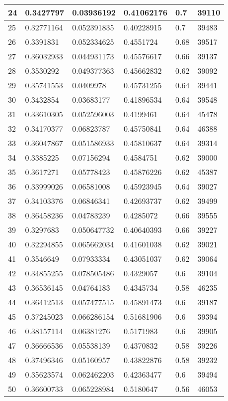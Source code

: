 \begin{longtable}{|l|l|l|l|l|l|}
24 & 0.3427797 & 0.03936192 & 0.41062176 & 0.7 & 39110 \\ \hline 
25 & 0.32771164 & 0.052391835 & 0.40228915 & 0.7 & 39483 \\ \hline 
26 & 0.3391831 & 0.052334625 & 0.4551724 & 0.68 & 39517 \\ \hline 
27 & 0.36032933 & 0.044931173 & 0.45576617 & 0.66 & 39137 \\ \hline 
28 & 0.3530292 & 0.049377363 & 0.45662832 & 0.62 & 39092 \\ \hline 
29 & 0.35741553 & 0.0409978 & 0.45731255 & 0.64 & 39441 \\ \hline 
30 & 0.3432854 & 0.03683177 & 0.41896534 & 0.64 & 39548 \\ \hline 
31 & 0.33610305 & 0.052596003 & 0.4199461 & 0.64 & 45478 \\ \hline 
32 & 0.34170377 & 0.06823787 & 0.45750841 & 0.64 & 46388 \\ \hline 
33 & 0.36047867 & 0.051586933 & 0.45810637 & 0.64 & 39314 \\ \hline 
34 & 0.3385225 & 0.07156294 & 0.4584751 & 0.62 & 39000 \\ \hline 
35 & 0.3617271 & 0.05778423 & 0.45876226 & 0.62 & 45387 \\ \hline 
36 & 0.33999026 & 0.06581008 & 0.45923945 & 0.64 & 39027 \\ \hline 
37 & 0.34103376 & 0.06846341 & 0.42693737 & 0.62 & 39499 \\ \hline 
38 & 0.36458236 & 0.04783239 & 0.4285072 & 0.66 & 39555 \\ \hline 
39 & 0.3297683 & 0.050647732 & 0.40640393 & 0.66 & 39227 \\ \hline 
40 & 0.32294855 & 0.065662034 & 0.41601038 & 0.62 & 39021 \\ \hline 
41 & 0.3546649 & 0.07933334 & 0.43051037 & 0.62 & 39064 \\ \hline 
42 & 0.34855255 & 0.078505486 & 0.4329057 & 0.6 & 39104 \\ \hline 
43 & 0.36536145 & 0.04764183 & 0.4345734 & 0.58 & 46235 \\ \hline 
44 & 0.36412513 & 0.057477515 & 0.45891473 & 0.6 & 39187 \\ \hline 
45 & 0.37245023 & 0.066286154 & 0.51681906 & 0.6 & 39394 \\ \hline 
46 & 0.38157114 & 0.06381276 & 0.5171983 & 0.6 & 39905 \\ \hline 
47 & 0.36666536 & 0.05538139 & 0.4370832 & 0.58 & 39226 \\ \hline 
48 & 0.37496346 & 0.05160957 & 0.43822876 & 0.58 & 39232 \\ \hline 
49 & 0.35623574 & 0.062462203 & 0.42363477 & 0.6 & 39494 \\ \hline 
50 & 0.36600733 & 0.065228984 & 0.5180647 & 0.56 & 46053 \\ \hline 
\end{longtable}
